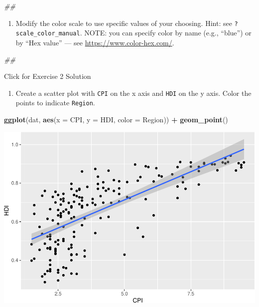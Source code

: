 \documentclass[
]{book}
\newenvironment{Shaded}{\begin{snugshade}}{\end{snugshade}}
\newcommand{\CommentTok}[1]{\textcolor[rgb]{0.56,0.35,0.01}{\textit{#1}}}
\newcommand{\DataTypeTok}[1]{\textcolor[rgb]{0.13,0.29,0.53}{#1}}
\newcommand{\KeywordTok}[1]{\textcolor[rgb]{0.13,0.29,0.53}{\textbf{#1}}}
\newcommand{\NormalTok}[1]{#1}
\newcommand{\OperatorTok}[1]{\textcolor[rgb]{0.81,0.36,0.00}{\textbf{#1}}}
\newcommand{\StringTok}[1]{\textcolor[rgb]{0.31,0.60,0.02}{#1}}
\providecommand{\tightlist}{%
  \setlength{\itemsep}{0pt}\setlength{\parskip}{0pt}}
\begin{document}
\begin{Shaded}
\begin{Highlighting}[]
\CommentTok{\#\# }
\end{Highlighting}
\end{Shaded}

\begin{enumerate}
\def\labelenumi{\arabic{enumi}.}
\setcounter{enumi}{2}
\tightlist
\item
  Modify the color scale to use specific values of your choosing. Hint: see \texttt{?scale\_color\_manual}. NOTE: you can specify color by name (e.g., ``blue'') or by ``Hex value'' --- see \url{https://www.color-hex.com/}.
\end{enumerate}

\begin{Shaded}
\begin{Highlighting}[]
\CommentTok{\#\# }
\end{Highlighting}
\end{Shaded}

{Click for Exercise 2 Solution}

\begin{enumerate}
\def\labelenumi{\arabic{enumi}.}
\tightlist
\item
  Create a scatter plot with \texttt{CPI} on the x axis and \texttt{HDI} on the y axis. Color the points to indicate \texttt{Region}.
\end{enumerate}

\begin{Shaded}
\begin{Highlighting}[]
\KeywordTok{ggplot}\NormalTok{(dat, }\KeywordTok{aes}\NormalTok{(}\DataTypeTok{x =}\NormalTok{ CPI, }\DataTypeTok{y =}\NormalTok{ HDI, }\DataTypeTok{color =}\NormalTok{ Region)) }\OperatorTok{+}
\StringTok{  }\KeywordTok{geom\_point}\NormalTok{()}
\end{Highlighting}
\end{Shaded}

\includegraphics{R/Rgraphics/figures/unnamed-chunk-205-1.pdf}
\end{document}
